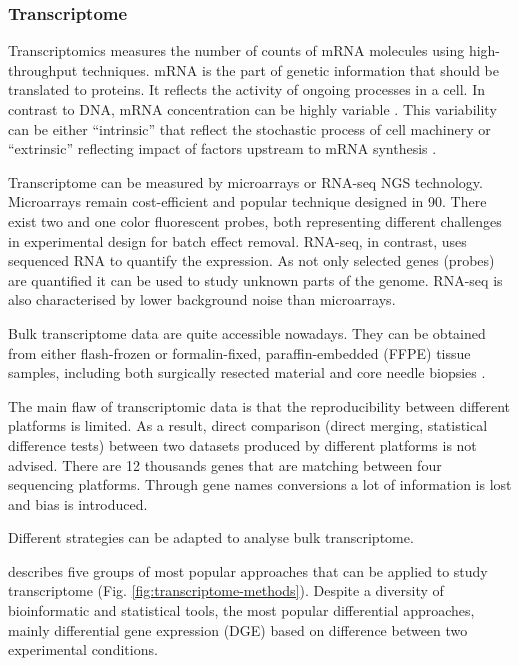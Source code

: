 \documentclass[12pt,]{book}
\theoremstyle{definition}
\theoremstyle{definition}
\theoremstyle{definition}
\theoremstyle{remark}
\begin{document}
\hypertarget{transcriptome}{%
\subsubsection{Transcriptome}\label{transcriptome}}

Transcriptomics measures the number of counts of mRNA molecules using
high-throughput techniques. mRNA is the part of genetic information that
should be translated to proteins. It reflects the activity of ongoing
processes in a cell. In contrast to DNA, mRNA concentration can be
highly variable \citep{Velculescu1997}. This variability can be either
``intrinsic'' that reflect the stochastic process of cell machinery or
``extrinsic'' reflecting impact of factors upstream to mRNA synthesis
\citep{Satija2014}.

Transcriptome can be measured by microarrays or RNA-seq NGS technology.
Microarrays remain cost-efficient and popular technique designed in 90.
There exist two and one color fluorescent probes, both representing
different challenges in experimental design for batch effect removal.
RNA-seq, in contrast, uses sequenced RNA to quantify the expression. As
not only selected genes (probes) are quantified it can be used to study
unknown parts of the genome. RNA-seq is also characterised by lower
background noise than microarrays.

Bulk transcriptome data are quite accessible nowadays. They can be
obtained from either flash-frozen or formalin-fixed, paraffin-embedded
(FFPE) tissue samples, including both surgically resected material and
core needle biopsies \citep{Schelker2017}.

The main flaw of transcriptomic data is that the reproducibility between
different platforms is limited. As a result, direct comparison (direct
merging, statistical difference tests) between two datasets produced by
different platforms is not advised. There are 12 thousands genes that
are matching between four sequencing platforms. Through gene names
conversions a lot of information is lost and bias is introduced.

Different strategies can be adapted to analyse bulk transcriptome.

\citet{Cieslik2017} describes five groups of most popular approaches
that can be applied to study transcriptome (Fig.
\ref{fig:transcriptome-methods}). Despite a diversity of bioinformatic
and statistical tools, the most popular differential approaches, mainly
differential gene expression (DGE) based on difference between two
experimental conditions.
\end{document}
